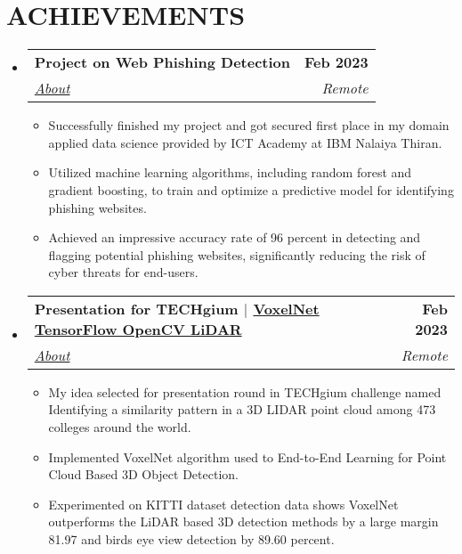 \documentclass[letterpaper,11pt]{article}
\makeatletter
\newcommand{\resumeItem}[1]{
  \item\small{
    {#1 \vspace{-2pt}}
  }
}
\newcommand{\resumeSubheading}[4]{
  \vspace{-2pt}\item
    \begin{tabular*}{1.0\textwidth}[t]{l@{\extracolsep{\fill}}r}
      \textbf{\large#1} & \textbf{\small #2} \\
      \textit{\large#3} & \textit{\small #4} \\
      
    \end{tabular*}\vspace{-7pt}
}
\newcommand{\resumeSubHeadingListStart}{\begin{itemize}[leftmargin=0.0in, label={}]}
\newcommand{\resumeSubHeadingListEnd}{\end{itemize}}
\newcommand{\resumeItemListStart}{\begin{itemize}}
\newcommand{\resumeItemListEnd}{\end{itemize}\vspace{-5pt}}
\makeatother
\begin{document}
\section{ACHIEVEMENTS}
    \resumeSubHeadingListStart
        \resumeSubheading{Project on Web Phishing Detection \href{https://courses.ictacademy.skillsnetwork.site/certificates/20c6a6b70e7a480ba4114a1abcc4aa96} {\raisebox{-0.1\height}\faExternalLink } }
        {Feb 2023}{\underline{About}}{Remote}
            \vspace{1pt}
            \resumeItemListStart
                \resumeItem{\normalsize{Successfully finished my project and got secured first place in my domain applied data science provided by ICT Academy at IBM Nalaiya Thiran. \textbf{}}}
                \vspace{2pt}
                \resumeItem{\normalsize{Utilized machine learning algorithms, including random forest and gradient boosting, to train and optimize a predictive model for identifying phishing websites. \textbf{}}}
                \vspace{2pt}
                \resumeItem{\normalsize{Achieved an impressive accuracy rate of 96 percent in detecting and flagging potential phishing websites, significantly reducing the risk of cyber threats for end-users. \textbf{}}}
            \resumeItemListEnd
            
    \resumeSubheading{Presentation for TECHgium \href{https://drive.google.com/file/d/1xDHj6wnvC676K-z7R-MenoCu4KUbUCB5/view?usp=drive_link} {\raisebox{-0.1\height}\faExternalLink }        
    $|$ \large{\underline{VoxelNet TensorFlow OpenCV LiDAR}}} {Feb 2023}{\underline{About}}{Remote}
    \vspace{1pt}
            \resumeItemListStart
                \resumeItem{\normalsize{My idea  selected for presentation round in TECHgium challenge named Identifying a similarity pattern in a 3D LIDAR point cloud among 473 colleges around the world.\textbf{}}}
                \vspace{2pt}
                \resumeItem{\normalsize{Implemented VoxelNet algorithm used to End-to-End Learning for Point Cloud Based 3D Object Detection.\textbf{}}}
                \vspace{-10pt}
                \resumeItem{\normalsize{Experimented on KITTI dataset detection data shows VoxelNet outperforms the LiDAR based 3D detection methods by a large margin 81.97 and birds eye view detection by 89.60 percent.\textbf{}}}
            \resumeItemListEnd
    \resumeSubHeadingListEnd
 \vspace{-10pt}
 
\end{document}
